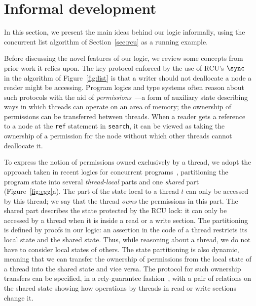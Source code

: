 %

\section{Informal development\label{sec:informal}}

In this section, we present the main ideas behind our logic informally, using
the concurrent list algorithm of Section~\ref{sec:rcu} as a running example.

  Before discussing the
novel features of our logic, we review some concepts from prior work it relies
upon. The key protocol enforced by the use of RCU's $\sync$ in the algorithm of
Figure~\ref{fig:list} is that a writer should not deallocate a node a reader
might be accessing. Program logics and type systems often reason about such
protocols with the aid of {\em
  permissions}~\cite{boyland,permissions,fucker-rustan}---a form of auxiliary
state describing ways in which threads can operate on an area of memory; the
ownership of permissions can be transferred between threads. When a reader gets
a reference to a node at the {\tt ref} statement in {\tt search}, it can be
viewed as taking the ownership of a permission for the node without which other
threads cannot deallocate it.

To express the notion of permissions owned exclusively by a thread, we adopt the
approach taken in recent logics for concurrent
programs~\cite{seplogic-concurrent,rgsep,sagl,fucker-rustan,cap,hyperv},
partitioning the program state into several {\em thread-local} parts and one
{\em shared} part (Figure~\ref{fig:egg}a). The part of the state local to a
thread $t$ can only be accessed by this thread; we say that the thread {\em
  owns} the permissions in this part. The shared part describes the state
protected by the RCU lock: it can only be accessed by a thread when it is inside
a read or a write section. The partitioning is defined by proofs in our logic:
an assertion in the code of a thread restricts its local state and the shared
state.  Thus, while reasoning about a thread, we do not have to consider local
states of others. The state partitioning is also dynamic, meaning that we can
transfer the ownership of permissions from the local state of a thread into the
shared state and vice versa. The protocol for such ownership transfers can be
specified, in a rely-guarantee fashion~\cite{Jones83,Pnueli}, with a pair of
relations on the shared state showing how operations by threads in read or write
sections change it.

